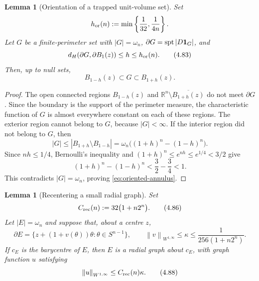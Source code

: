 \documentclass[11pt]{amsart}
\newtheorem{lemma}[theorem]{Lemma}
\theoremstyle{definition}
\newcommand{\R}{\mathbb R}
\newcommand{\norm}[1]{\left\|#1\right\|}
\begin{document}
\begin{lemma}[Orientation of a trapped unit-volume set]\label{lem:phase-orient}
Set
\[
   h_{\rm or}(n):=\min\left\{\frac1{32},\frac1{4n}\right\}.
\]
Let \(G\) be a finite-perimeter set with \(|G|=\omega_n\),
\(\partial G=\operatorname{spt}|D{\bf1}_G|\), and
\[
   d_H(\partial G,\partial B_1(z))\le h\le h_{\rm or}(n).
\tag{4.83}\label{eq:trapped-H}
\]
Then, up to null sets,
\[
   B_{1-h}(z)\subset G\subset B_{1+h}(z).
\tag{4.84}\label{eq:oriented-annulus}
\]
\end{lemma}

\begin{proof}
The open connected regions \(B_{1-h}(z)\) and
\(\R^n\setminus\overline{B_{1+h}(z)}\) do not meet \(\partial G\).
Since the boundary is the support of the perimeter measure, the
characteristic function of \(G\) is almost everywhere constant on each
of these regions.  The exterior region cannot belong to \(G\), because
\(|G|<\infty\).  If the interior region did not belong to \(G\), then
\[
   |G|\le |B_{1+h}\setminus B_{1-h}|
       =\omega_n\bigl((1+h)^n-(1-h)^n\bigr).
\]
Since \(nh\le1/4\), Bernoulli's inequality and
\((1+h)^n\le e^{nh}\le e^{1/4}<3/2\) give
\[
   (1+h)^n-(1-h)^n
      <\frac32-\frac34<1.
\tag{4.85}\label{eq:orientation-small}
\]
This contradicts \(|G|=\omega_n\), proving
\eqref{eq:oriented-annulus}.
\end{proof}

\begin{lemma}[Recentering a small radial graph]\label{lem:graph-recentre}
Set
\[
   C_{\rm rec}(n):=32\bigl(1+n2^n\bigr).
\tag{4.86}\label{eq:Crec}
\]
Let \(|E|=\omega_n\) and suppose that, about a centre \(z\),
\[
   \partial E=\{z+(1+v(\theta))\theta:\theta\in S^{n-1}\},
   \qquad
   \norm{v}_{W^{1,\infty}}\le\kappa
   \le\frac{1}{256(1+n2^n)}.
\tag{4.87}\label{eq:recentre-input}
\]
If \(c_E\) is the barycentre of \(E\), then \(E\) is a radial graph
about \(c_E\), with graph function \(u\) satisfying
\[
   \norm{u}_{W^{1,\infty}}
      \le C_{\rm rec}(n)\kappa.
\tag{4.88}\label{eq:recentre-output}
\]
\end{lemma}
\end{document}
